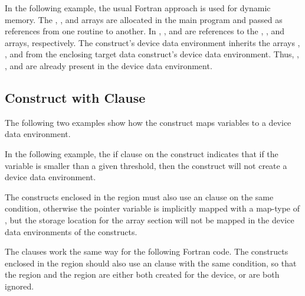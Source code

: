 In the following example, the usual Fortran approach is used for dynamic memory. 
The , , and  arrays are allocated in the main program and passed as references 
from one routine to another. In , ,  and  are references to the 
, , and  arrays, respectively. The  construct's device data 
environment inherits the arrays , , and  from the enclosing target data construct's 
device data environment. Thus, , , and  are already present in the device 
data environment.


\subsection{ Construct with  Clause}
\label{subsec:target_data_if}

The following two examples show how the  construct 
maps variables to a device data environment.

In the following example, the if clause on the  construct 
indicates that if the variable  is smaller than a given threshold, then 
the  construct will not create a device data environment.

The  constructs enclosed in the  region 
must also use an  clause on the same condition, otherwise the pointer 
variable  is implicitly mapped with a map-type of , but the storage 
location for the array section  will not be mapped in the device data environments 
of the  constructs.


The  clauses work the same way for the following Fortran code. The  
constructs enclosed in the  region should also use 
an  clause with the same condition, so that the  
region and the  region are either both created for the device, or 
are both ignored.


